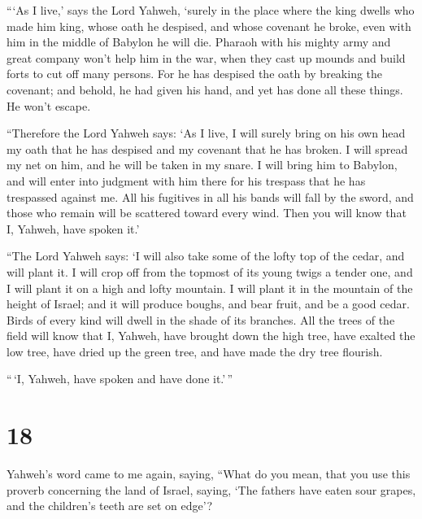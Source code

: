  ```As I live,' says the Lord Yahweh, `surely in the place
where the king dwells who made him king, whose oath he despised, and
whose covenant he broke, even with him in the middle of Babylon he will
die.  Pharaoh with his mighty army and great company won't
help him in the war, when they cast up mounds and build forts to cut off
many persons.  For he has despised the oath by breaking the
covenant; and behold, he had given his hand, and yet has done all these
things. He won't escape.

 ``Therefore the Lord Yahweh says: `As I live, I will
surely bring on his own head my oath that he has despised and my
covenant that he has broken.  I will spread my net on him,
and he will be taken in my snare. I will bring him to Babylon, and will
enter into judgment with him there for his trespass that he has
trespassed against me.  All his fugitives in all his bands
will fall by the sword, and those who remain will be scattered toward
every wind. Then you will know that I, Yahweh, have spoken it.'

 ``The Lord Yahweh says: `I will also take some of the
lofty top of the cedar, and will plant it. I will crop off from the
topmost of its young twigs a tender one, and I will plant it on a high
and lofty mountain.  I will plant it in the mountain of the
height of Israel; and it will produce boughs, and bear fruit, and be a
good cedar. Birds of every kind will dwell in the shade of its branches.
 All the trees of the field will know that I, Yahweh, have
brought down the high tree, have exalted the low tree, have dried up the
green tree, and have made the dry tree flourish.

``\,`I, Yahweh, have spoken and have done it.'\,''

\hypertarget{section-16}{%
\section{18}\label{section-16}}

 Yahweh's word came to me again, saying,  ``What
do you mean, that you use this proverb concerning the land of Israel,
saying, `The fathers have eaten sour grapes, and the children's teeth
are set on edge'?

